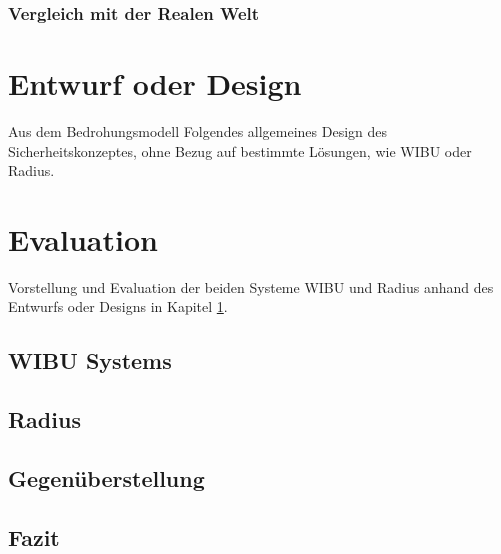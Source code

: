 \documentclass[11pt,a4paper]{report}
\begin{document}
\subsection{Vergleich mit der Realen Welt}


\chapter{Entwurf oder Design} \label{chap:design}

Aus dem Bedrohungsmodell Folgendes allgemeines Design des Sicherheitskonzeptes, ohne Bezug auf bestimmte Lösungen, wie WIBU oder Radius.

\chapter{Evaluation} \label{chap:evaluation}

Vorstellung und Evaluation der beiden Systeme WIBU und Radius anhand des Entwurfs oder Designs in Kapitel \ref{chap:design}.

\section{WIBU Systems}

\section{Radius}

\section{Gegenüberstellung}

\section{Fazit}
\end{document}
